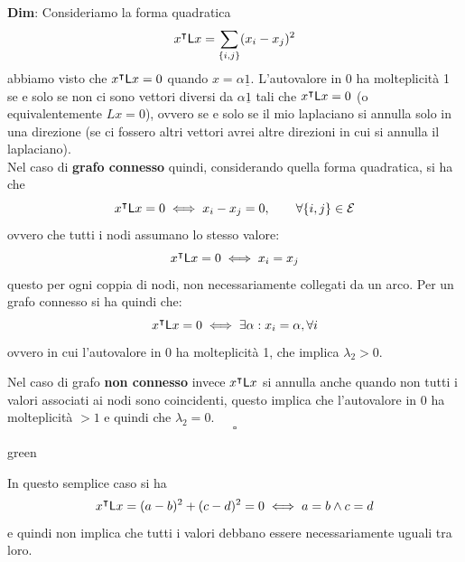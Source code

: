 \begin{tcolorbox}
\textbf{Dim}: Consideriamo la forma quadratica
\[
x^\intercal \mathsf{L} x = \sum_{\{i,j\}} (x_i - x_j)^2
\]
abbiamo visto che $x^\intercal \mathsf{L} x = 0$ quando $x = \alpha \underline{1}$. L'autovalore in 0 ha molteplicit\`a 1 se e solo se non ci sono vettori diversi da $\alpha \underline{1}$ tali che $x^\intercal \mathsf{L} x = 0$ (o equivalentemente $Lx = 0$), ovvero se e solo se il mio laplaciano si annulla solo in una direzione (se ci fossero altri vettori avrei altre direzioni in cui si annulla il laplaciano).\\
Nel caso di \textbf{grafo connesso} quindi, considerando quella forma quadratica, si ha che
\[
x^\intercal \mathsf{L} x = 0 \iff x_i - x_j = 0, \qquad \forall \{i,j\} \in \mathcal{E}
\]
ovvero che tutti i nodi assumano lo stesso valore:
\[
x^\intercal \mathsf{L} x = 0 \iff x_i = x_j
\]
questo per ogni coppia di nodi, non necessariamente collegati da un arco.
Per un grafo connesso si ha quindi che:
\[
x^\intercal \mathsf{L} x = 0 \iff \exists \alpha: x_i = \alpha, \forall i
\]
ovvero in cui l'autovalore in 0 ha molteplicit\`a 1, che implica $\lambda_2 > 0$.

Nel caso di grafo \textbf{non connesso} invece $x^\intercal \mathsf{L} x$ si annulla anche quando non tutti i valori associati ai nodi sono coincidenti, questo implica che l'autovalore in 0 ha molteplicit\`a $>1$ e quindi che $\lambda_2 = 0$.
\[
\square
\]
\end{tcolorbox}
\begin{mybox}{green}{}
\begin{minipage}{0.3\textwidth}
\end{minipage}
\begin{minipage}{0.7\textwidth}
In questo semplice caso si ha 
\begin{equation*}
    x^\intercal \mathsf{L} x = (a - b)^2 + (c- d)^2 = 0 \iff a=b \land c=d
\end{equation*} 
e quindi non implica che tutti i valori debbano essere necessariamente uguali tra loro.
\end{minipage} \hspace{4pt}
\end{mybox}

